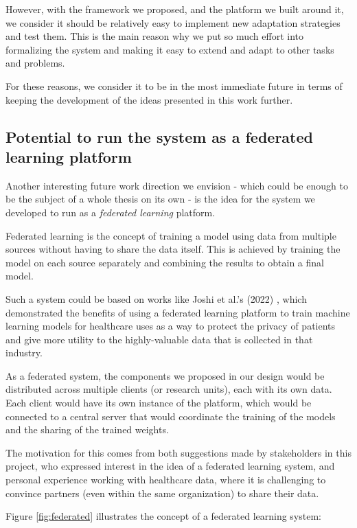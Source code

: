 \documentclass[../main.tex]{subfiles}
\begin{document}
    However, with the framework we proposed, and the platform we built around it, we consider it should be relatively easy to implement new adaptation strategies and test them. This is the main reason why we put so much effort into formalizing the system and making it easy to extend and adapt to other tasks and problems.

    For these reasons, we consider it to be in the most immediate future in terms of keeping the development of the ideas presented in this work further.

    \subsection{Potential to run the system as a federated learning platform} \label{conclusions:future_work:federated} 

    Another interesting future work direction we envision - which could be enough to be the subject of a whole thesis on its own - is the idea for the system we developed to run as a \textit{federated learning} platform.

    Federated learning is the concept of training a model using data from multiple sources without having to share the data itself. This is achieved by training the model on each source separately and combining the results to obtain a final model. 
    
    Such a system could be based on works like Joshi et al.'s (2022) \cite{joshi_federated_2022}, which demonstrated the benefits of using a federated learning platform to train machine learning models for healthcare uses as a way to protect the privacy of patients and give more utility to the highly-valuable data that is collected in that industry.
    
    As a federated system, the components we proposed in our design would be distributed across multiple clients (or research units), each with its own data. Each client would have its own instance of the platform, which would be connected to a central server that would coordinate the training of the models and the sharing of the trained weights.

    The motivation for this comes from both suggestions made by stakeholders in this project, who expressed interest in the idea of a federated learning system, and personal experience working with healthcare data, where it is challenging to convince partners (even within the same organization) to share their data. 

    Figure \ref{fig:federated} illustrates the concept of a federated learning system:
\end{document}
